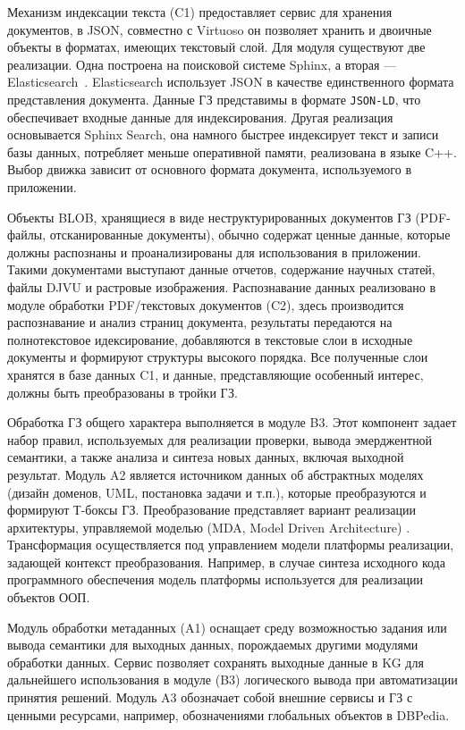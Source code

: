 \documentclass[
]{aiitart}
\begin{document}
Механизм индексации текста (C1) предоставляет сервис для хранения документов, в JSON, совместно с Virtuoso он позволяет хранить и двоичные объекты в форматах, имеющих текстовый слой. Для модуля существуют две реализации. Одна построена на поисковой системе Sphinx, а вторая — Elasticsearch~\cite{b13}. Elasticsearch использует JSON в качестве единственного формата представления документа.  Данные ГЗ представимы в формате \verb|JSON-LD|, что обеспечивает входные данные для индексирования. Другая реализация основывается Sphinx Search, она намного быстрее индексирует текст и записи базы данных, потребляет меньше оперативной памяти, реализована в языке C++. Выбор движка зависит от основного формата документа, используемого в приложении.

Объекты BLOB, хранящиеся в виде неструктурированных документов ГЗ (PDF-файлы, отсканированные документы), обычно содержат ценные данные, которые должны распознаны и проанализированы для использования в приложении. Такими документами выступают данные отчетов, содержание научных статей, файлы DJVU и растровые изображения. Распознавание данных реализовано в модуле обработки PDF/текстовых документов (C2), здесь производится распознавание и анализ страниц документа, результаты передаются на полнотекстовое идексирование, добавляются в текстовые слои в исходные документы и формируют структуры высокого порядка. Все полученные слои хранятся в базе данных C1, и данные, представляющие особенный интерес, должны быть преобразованы в тройки ГЗ.

Обработка ГЗ общего характера выполняется в модуле B3. Этот компонент задает набор правил, используемых для реализации проверки, вывода эмерджентной семантики, а также анализа и синтеза новых данных, включая выходной результат. Модуль A2 является источником данных об абстрактных моделях (дизайн доменов, UML, постановка задачи и т.п.), которые преобразуются и формируют Т-боксы ГЗ. Преобразование представляет вариант реализации архитектуры, управляемой моделью (MDA, Model Driven Architecture) \cite{b2}. Трансформация осуществляется под управлением модели платформы реализации, задающей контекст преобразования. Например, в случае синтеза исходного кода программного обеспечения модель платформы используется для реализации объектов ООП.

Модуль обработки метаданных (A1) оснащает среду возможностью задания или вывода семантики для выходных данных, порождаемых другими модулями обработки данных. Сервис позволяет сохранять выходные данные в KG для дальнейшего использования в модуле (B3) логического вывода при автоматизации принятия решений. Модуль A3 обозначает собой внешние сервисы и ГЗ с ценными ресурсами, например, обозначениями \cite{b3}глобальных объектов в DBPedia.
\end{document}
